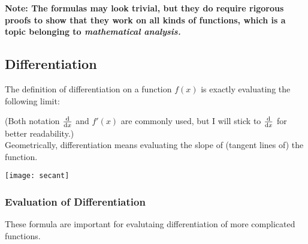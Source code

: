\documentclass[class=article, crop=false, 12pt]{standalone}
\begin{document}
\bf{Note:} The formulas may look trivial, 
but they do require rigorous proofs to show that they work on all kinds of functions, 
which is a topic belonging to \it{mathematical analysis}.


\subsection{Differentiation}

The definition of differentiation on a function $f(x)$ is exactly evaluating the following limit:

(Both notation $\dv{x}$ and $f'(x)$ are commonly used, but I will stick to $\dv{x}$ for better readability.)\\ 

Geometrically, differentiation means evaluating the slope of (tangent lines of) the function.

\begin{center}
    \begin{minipage}{0.3\textwidth}
        \centering
        \texttt{[image: secant]}
    \end{minipage}
    \hspace{0.05\textwidth}
    \begin{minipage}{0.5\textwidth}
        \centering
    \end{minipage}
\end{center}


\subsubsection{Evaluation of Differentiation}

These formula are important for evalutaing differentiation of more complicated functions.
\end{document}

